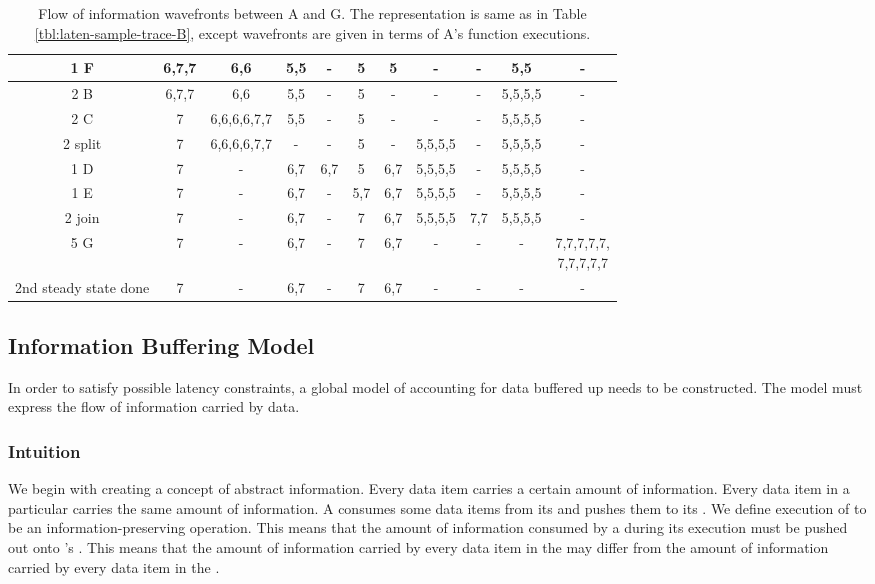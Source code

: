 \begin{table}
\begin{tabular}{|c|c|c|c|c|c|c|c|c|c|c|}
\hline 1 F & 6,7,7 & 6,6 & 5,5 & - & 5 & 5 & - & - & 5,5 & - \\
\hline 2 B & 6,7,7 & 6,6 & 5,5 & - & 5 & - & - & - & 5,5,5,5 & - \\
\hline 2 C & 7 & 6,6,6,6,7,7 & 5,5 & - & 5 & - & - & - & 5,5,5,5 & - \\
\hline 2 split & 7 & 6,6,6,6,7,7 & - & - & 5 & - & 5,5,5,5 & - & 5,5,5,5 & - \\
\hline 1 D & 7 & - & 6,7 & 6,7 & 5 & 6,7 & 5,5,5,5 & - & 5,5,5,5 & - \\
\hline 1 E & 7 & - & 6,7 & - & 5,7 & 6,7 & 5,5,5,5 & - & 5,5,5,5 & - \\
\hline 2 join & 7 & - & 6,7 & - & 7 & 6,7 & 5,5,5,5 & 7,7 & 5,5,5,5 & - \\
\hline 5 G & 7 & - & 6,7 & - & 7 & 6,7 & - & - & - & \parbox{0.5in}{7,7,7,7,7, \\ 7,7,7,7,7} \\
\hline \parbox{0.7in}{\centering 2nd steady state done} & 7 & - & 6,7 & - & 7 & 6,7 & - & - & - & - \\
\hline
\end{tabular}
\caption[Flow of information wavefronts between {\filters} A and G
in Figure \ref{fig:constrained-example}]{Flow of information
wavefronts between {\filters} A and G. The representation is same
as in Table \ref{tbl:laten-sample-trace-B}, except wavefronts are
given in terms of {\filter} A's {\work} function executions.}
\label{tbl:laten-sample-trace-A}
\end{table}

\subsection{Information Buffering Model}
\label{sec:constrained:info}

In order to satisfy possible latency constraints, a global model
of accounting for data buffered up needs to be constructed.  The
model must express the flow of information carried by data.

\subsubsection{Intuition}

We begin with creating a concept of abstract information.  Every
data item carries a certain amount of information.  Every data
item in a particular {{\Channel}} carries the same amount of
information.  A {\filter} consumes some data items from its {\Input}
{{\Channel}} and pushes them to its {\Output} {{\Channel}}.  We define
execution of {\filters} to be an information-preserving operation.
This means that the amount of information consumed by a {\filter}
during its execution must be pushed out onto {\filter}'s {\Output}
{{\Channel}}. This means that the amount of information carried by
every data item in the {\Input} {{\Channel}} may differ from the amount
of information carried by every data item in the {\Output} {{\Channel}}.

